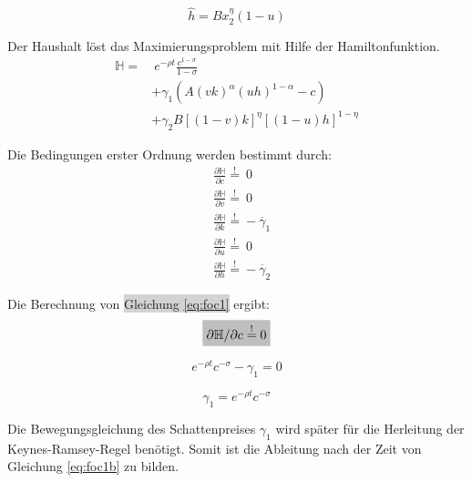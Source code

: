 	\begin{equation}
		\boxed{\hat{h}=Bx_2^\eta(1-u)}
	\end{equation}


Der Haushalt löst das Maximierungsproblem mit Hilfe der Hamiltonfunktion.\\


	\begin{equation}
		\begin{split}\mathbb{H}=&~e^{-\rho t}\frac{c^{1-\sigma}}{1-\sigma}\\
		&+\gamma_1(A(vk)^\alpha(uh)^{1-\alpha}-c)\\
		&+\gamma_2B[(1-v)k]^{\eta}[(1-u)h]^{1-\eta}\end{split}
	\end{equation}


Die Bedingungen erster Ordnung werden bestimmt durch:\\


	\begin{align}
		&\frac{\partial\mathbb{H}}{\partial c}\overset{!}{=}~0\label{eq:foc1}\\
		&\frac{\partial\mathbb{H}}{\partial v}\overset{!}{=}~0\label{eq:foc2}\\
		&\frac{\partial\mathbb{H}}{\partial k}\overset{!}{=}-\dot{\gamma_1}\label{eq:foc3}\\
		&\frac{\partial\mathbb{H}}{\partial u}\overset{!}{=}~0\label{eq:foc4}\\
		&\frac{\partial\mathbb{H}}{\partial h}\overset{!}{=}-\dot{\gamma_2}\label{eq:foc5}
	\end{align}


Die Berechnung von \colorbox{lightgray}{Gleichung \eqref{eq:foc1}} ergibt:\\

	
	\begin{equation*}
		\colorbox{lightgray}{$\partial\mathbb{H}/\partial c\overset{!}{=}0$}
	\end{equation*}

	
	\begin{equation}
		e^{-\rho t}c^{-\sigma}-\gamma_1 = 0\label{eq:foc1a}
	\end{equation}


	\begin{equation}
		\gamma_1 = e^{-\rho t}c^{-\sigma}\label{eq:foc1b}
	\end{equation}


Die Bewegungsgleichung des Schattenpreises $\gamma_1$ wird später für die Herleitung der  Keynes-Ramsey-Regel benötigt. Somit ist die Ableitung nach der Zeit von Gleichung \eqref{eq:foc1b} zu bilden.


